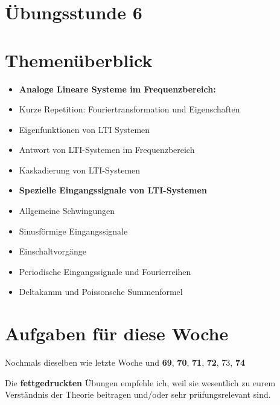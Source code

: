 \documentclass[11pt]{article}
\begin{document}
\thispagestyle{firstpage}

\setlength{\headheight}{1 \baselineskip}  %
\setlength{\parindent}{0pt}  %
\setlength{\parskip}{\baselineskip}  %

\vspace*{-5px}
\section*{Übungsstunde 6}

\section*{Themenüberblick}
\begin{itemize}
    \item \textbf{Analoge Lineare Systeme im Frequenzbereich:}
    \item[] Kurze Repetition: Fouriertransformation und Eigenschaften
    \item[] Eigenfunktionen von LTI Systemen
    \item[] Antwort von LTI-Systemen im Frequenzbereich
    \item[] Kaskadierung von LTI-Systemen
    \item \textbf{Spezielle Eingangssignale von LTI-Systemen}
    \item[] Allgemeine Schwingungen
    \item[] Sinusförmige Eingangssignale 
    \item[] Einschaltvorgänge
    \item[] Periodische Eingangssignale und Fourierreihen
    \item[] Deltakamm und Poissonsche Summenformel
\end{itemize}

\section*{Aufgaben für diese Woche}
\vspace{-0.5cm}

Nochmals dieselben wie letzte Woche und \textbf{69}, \textbf{70}, \textbf{71}, \textbf{72}, 73, \textbf{74}\\
\vspace{-0.5cm}

Die \textbf{fettgedruckten} Übungen empfehle ich, weil sie wesentlich zu eurem Verständnis der Theorie beitragen und/oder sehr prüfungsrelevant sind.
\end{document}
